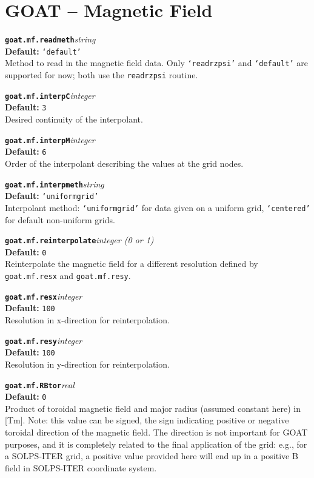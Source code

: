 \documentclass[10pt,a4paper]{article}
\newcommand{\sw}[4]{%
  \par\vspace{0.7em}%
  \begin{minipage}{\linewidth}\raggedright
    \textbf{\texttt{#1}}\hfill\textit{#2}\\[0.1em]
    \textbf{Default:} #3\\[0.1em]
    #4\par
    \vspace{0.3em}{\color{swgrey}\hrule}
  \end{minipage}\par}
\begin{document}
\section{GOAT -- Magnetic Field}
\sw{goat.mf.readmeth}{string}{\texttt{`default'}}{Method to read in the magnetic field data. Only \texttt{`readrzpsi'} and \texttt{`default'} are supported for now; both use the \texttt{readrzpsi} routine.}
\sw{goat.mf.interpC}{integer}{\texttt{3}}{Desired continuity of the interpolant.}
\sw{goat.mf.interpM}{integer}{\texttt{6}}{Order of the interpolant describing the values at the grid nodes.}
\sw{goat.mf.interpmeth}{string}{\texttt{`uniformgrid'}}{Interpolant method: \texttt{`uniformgrid'} for data given on a uniform grid, \texttt{`centered'} for default non-uniform grids.}
\sw{goat.mf.reinterpolate}{integer (0 or 1)}{\texttt{0}}{Reinterpolate the magnetic field for a different resolution defined by \texttt{goat.mf.resx} and \texttt{goat.mf.resy}.}
\sw{goat.mf.resx}{integer}{\texttt{100}}{Resolution in x-direction for reinterpolation.}
\sw{goat.mf.resy}{integer}{\texttt{100}}{Resolution in y-direction for reinterpolation.}
\sw{goat.mf.RBtor}{real}{\texttt{0}}{Product of toroidal magnetic field and major radius (assumed constant here) in [Tm]. Note: this value can be signed, the sign indicating positive or negative toroidal direction of the magnetic field.
The direction is not important for GOAT purposes, and it is completely related to the final application of the grid: e.g., for a SOLPS-ITER grid, a positive value provided here will end up in a positive B field in SOLPS-ITER coordinate system.}

\end{document}
